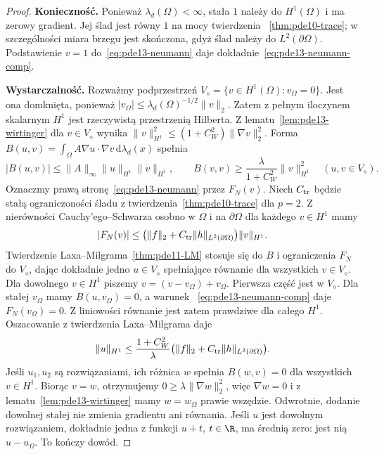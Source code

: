\begin{proof}
\textbf{Konieczność.} Ponieważ $\lambda_d(\Omega)<\infty$,
stała $1$ należy do $H^1(\Omega)$ i ma zerowy gradient.
Jej ślad jest równy $1$ na mocy twierdzenia
~\ref{thm:pde10-trace}; w szczególności miara brzegu jest
skończona, gdyż ślad należy do $L^2(\partial\Omega)$.
Podstawienie $v=1$ do~\eqref{eq:pde13-neumann}
daje dokładnie~\eqref{eq:pde13-neumann-comp}.

\textbf{Wystarczalność.} Rozważmy podprzestrzeń
$V_\diamond=\{v\in H^1(\Omega):v_\Omega=0\}$.
Jest ona domknięta, ponieważ
$|v_\Omega|\le\lambda_d(\Omega)^{-1/2}\|v\|_2$.
Zatem z pełnym iloczynem skalarnym $H^1$ jest rzeczywistą
przestrzenią Hilberta. Z lematu~\ref{lem:pde13-wirtinger}
dla $v\in V_\diamond$ wynika
$\|v\|_{H^1}^2\le(1+C_W^2)\|\nabla v\|_2^2$.
Forma $B(u,v)=\int_\Omega A\nabla u\cdot\nabla v
\,\mathrm d\lambda_d(x)$ spełnia
\[
 |B(u,v)|\le\|A\|_\infty\|u\|_{H^1}\|v\|_{H^1},
 \qquad B(v,v)\ge\frac{\lambda}{1+C_W^2}\|v\|_{H^1}^2
 \quad(u,v\in V_\diamond).
\]
Oznaczmy prawą stronę~\eqref{eq:pde13-neumann} przez $F_N(v)$.
Niech $C_{\rm tr}$ będzie stałą ograniczoności śladu
z twierdzenia~\ref{thm:pde10-trace} dla $p=2$.
Z nierówności Cauchy'ego--Schwarza osobno w $\Omega$
i na $\partial\Omega$ dla każdego $v\in H^1$ mamy
\[
 |F_N(v)|\le
 \big(\|f\|_2+C_{\rm tr}\|h\|_{L^2(\partial\Omega)}\big)
 \|v\|_{H^1}.
\]
Twierdzenie Laxa--Milgrama~\ref{thm:pde11-LM} stosuje się
do $B$ i ograniczenia $F_N$ do $V_\diamond$, dając
dokładnie jedno $u\in V_\diamond$ spełniające równanie
dla wszystkich $v\in V_\diamond$.
Dla dowolnego $v\in H^1$ piszemy $v=(v-v_\Omega)+v_\Omega$.
Pierwsza część jest w $V_\diamond$. Dla stałej $v_\Omega$
mamy $B(u,v_\Omega)=0$, a warunek
~\eqref{eq:pde13-neumann-comp} daje $F_N(v_\Omega)=0$.
Z liniowości równanie jest zatem prawdziwe dla całego $H^1$.
Oszacowanie z twierdzenia Laxa--Milgrama daje
\[
 \|u\|_{H^1}\le
 \frac{1+C_W^2}{\lambda}
 \big(\|f\|_2+C_{\rm tr}\|h\|_{L^2(\partial\Omega)}\big).
\]
Jeśli $u_1,u_2$ są rozwiązaniami, ich różnica $w$ spełnia
$B(w,v)=0$ dla wszystkich $v\in H^1$. Biorąc $v=w$,
otrzymujemy $0\ge\lambda\|\nabla w\|_2^2$,
więc $\nabla w=0$ i z lematu~\ref{lem:pde13-wirtinger}
mamy $w=w_\Omega$ prawie wszędzie.
Odwrotnie, dodanie dowolnej stałej nie zmienia gradientu
ani równania. Jeśli $u$ jest dowolnym rozwiązaniem, dokładnie jedna
z funkcji $u+t$, $t\in\R$, ma średnią zero: jest nią
$u-u_\Omega$. To kończy dowód.
\end{proof}

